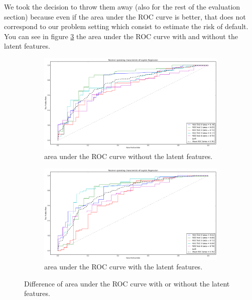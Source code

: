 		We took the decision to throw them away (also for the rest of the evaluation section) because even if the area under the ROC curve is better, that does not correspond to our problem setting which consist to estimate the risk of default. You can see in figure \ref{fig:auc_latent} the area under the ROC curve with and without the latent features.
		\begin{figure}[h!]
            \centering
            \begin{subfigure}[b]{0.98\textwidth}
                \includegraphics[width=\textwidth]{images/auc_without_latent.png}
                \caption{area under the ROC curve without the latent features.}
                \label{fig:auc_without_latent}
            \end{subfigure}
            \begin{subfigure}[b]{0.98\textwidth}
                \includegraphics[width=\textwidth]{images/auc_with_latent.png}
                \caption{area under the ROC curve with the latent features.}
                \label{fig:auc_with_latent}
            \end{subfigure}
            \caption{Difference of area under the ROC curve with or without the latent features.}
            \label{fig:auc_latent}
        \end{figure}

